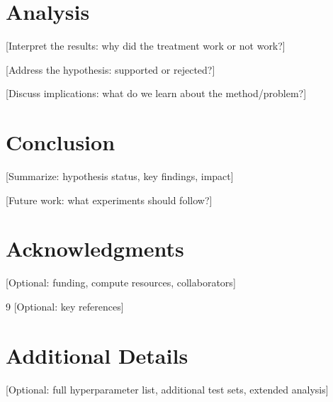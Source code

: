 \documentclass[11pt,a4paper]{article}
\begin{document}
\section{Analysis}
[Interpret the results: why did the treatment work or not work?]

[Address the hypothesis: supported or rejected?]

[Discuss implications: what do we learn about the method/problem?]

\section{Conclusion}
[Summarize: hypothesis status, key findings, impact]

[Future work: what experiments should follow?]

\section*{Acknowledgments}
[Optional: funding, compute resources, collaborators]

\begin{thebibliography}{9}
[Optional: key references]
\end{thebibliography}

\appendix
\section{Additional Details}
[Optional: full hyperparameter list, additional test sets, extended analysis]
\end{document}
